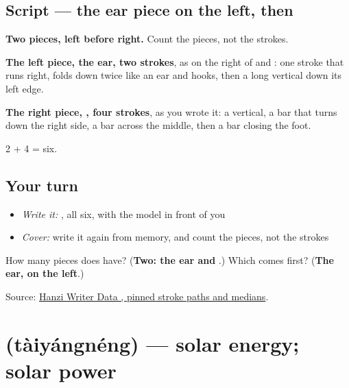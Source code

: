 \subsection*{Script — the ear piece on the left, then }

\begin{quote}
\end{quote}

\textbf{Two pieces, left before right.} Count the pieces, not the strokes.

\textbf{The left piece, the ear, two strokes}, as on the right of  and : one stroke that runs right, folds down twice like an ear and hooks, then a long vertical down its left edge.

\textbf{The right piece, , four strokes}, as you wrote it: a vertical, a bar that turns down the right side, a bar across the middle, then a bar closing the foot.

2 + 4 = six.

\subsection*{Your turn}
\begin{itemize}
\raggedright
  \item \emph{Write it:} , all six, with the model in front of you
  \item \emph{Cover:} write it again from memory, and count the pieces, not the strokes
\end{itemize}

\begin{tcolorbox}[breakable,colback=teal!4,colframe=teal!35!black,title={Before you move on}]
How many pieces does  have? (\textbf{Two: the ear and }.) Which comes first? (\textbf{The ear, on the left}.)

Source: \href{https://raw.githubusercontent.com/chanind/hanzi-writer-data/68d10a4b21150cae5e1ebbd223eed289cf32d90c/data/\%E9\%98\%B3.json}{Hanzi Writer Data , pinned stroke paths and medians}.
\end{tcolorbox}
\section[\texorpdfstring{\zh{太阳能} (tàiyángnéng)}{太阳能 (tàiyángnéng)}]{ (tàiyángnéng) — solar energy; solar power}

